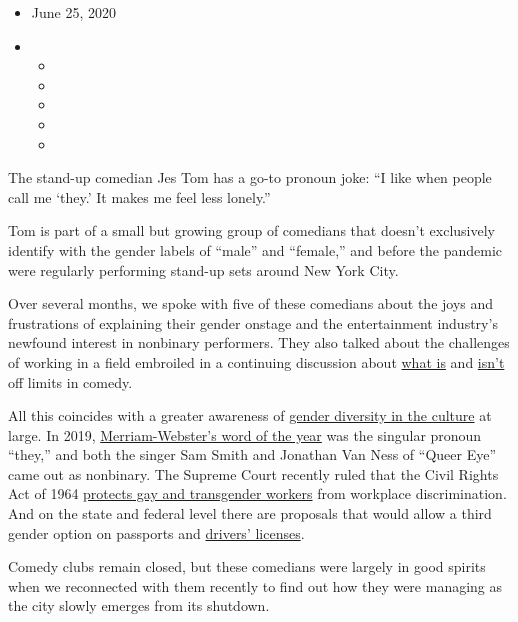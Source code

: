 \begin{itemize}
\item
  June 25, 2020
\item
  \begin{itemize}
  \item
  \item
  \item
  \item
  \item
  \end{itemize}
\end{itemize}

The stand-up comedian Jes Tom has a go-to pronoun joke: ``I like when
people call me `they.' It makes me feel less lonely.''

Tom is part of a small but growing group of comedians that doesn't
exclusively identify with the gender labels of ``male'' and ``female,''
and before the pandemic were regularly performing stand-up sets around
New York City.

Over several months, we spoke with five of these comedians about the
joys and frustrations of explaining their gender onstage and the
entertainment industry's newfound interest in nonbinary performers. They
also talked about the challenges of working in a field embroiled in a
continuing discussion about \href{https://nyti.ms/31tBFrA}{what is} and
\href{https://nyti.ms/2V4Xy0p}{isn't} off limits in comedy.

All this coincides with a greater awareness of
\href{https://www.nytimes3xbfgragh.onion/2019/06/04/magazine/gender-nonbinary.html}{gender
diversity in the culture} at large. In 2019,
\href{https://www.nytimes3xbfgragh.onion/2019/12/10/us/merriam-webster-they-word-year.html}{Merriam-Webster's
word of the year} was the singular pronoun ``they,'' and both the singer
Sam Smith and Jonathan Van Ness of ``Queer Eye'' came out as nonbinary.
The Supreme Court recently ruled that the Civil Rights Act of 1964
\href{https://www.nytimes3xbfgragh.onion/2020/06/15/us/gay-transgender-workers-supreme-court.html}{protects
gay and transgender workers} from workplace discrimination. And on the
state and federal level there are proposals that would allow a third
gender option on passports and
\href{https://www.nytimes3xbfgragh.onion/2019/05/29/us/nonbinary-drivers-licenses.html}{drivers'
licenses}.

Comedy clubs remain closed, but these comedians were largely in good
spirits when we reconnected with them recently to find out how they were
managing as the city slowly emerges from its shutdown.

